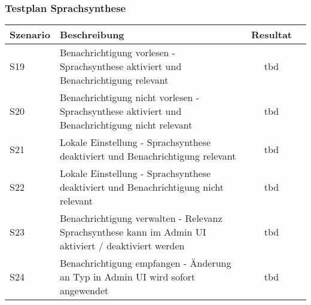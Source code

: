 \subsubsection{Testplan Sprachsynthese}

\begin{table}[h]
    \centering
    \begin{tabular}{|l|p{11cm}|c|c|}
        \hline
        \textbf{Szenario} & \textbf{Beschreibung}                                                                                                                                  & \textbf{Resultat} \\
        \hline
        S19         & Benachrichtigung vorlesen - Sprachsynthese aktiviert und Benachrichtigung relevant & tbd\\
        \hline
        S20         & Benachrichtigung nicht vorlesen - Sprachsynthese aktiviert und Benachrichtigung nicht relevant & tbd\\
        \hline
        S21         & Lokale Einstellung - Sprachsynthese deaktiviert und Benachrichtigung relevant  & tbd\\
        \hline
        S22         & Lokale Einstellung - Sprachsynthese deaktiviert und Benachrichtigung nicht relevant  & tbd\\
        \hline
        S23         & Benachrichtigung verwalten - Relevanz Sprachsynthese kann im Admin UI aktiviert / deaktiviert werden  & tbd\\
        \hline
        S24         & Benachrichtigung empfangen - Änderung an Typ in Admin UI wird sofort angewendet   & tbd\\
        \hline
    \end{tabular}\label{tab:testplan_sprachsynthese}
\end{table}

\clearpage

